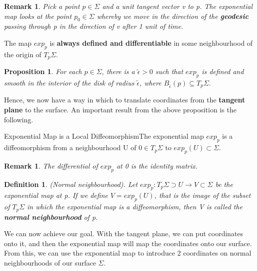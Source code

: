 \documentclass[twoside]{article}
\newtheorem{proposition}[theorem]{Proposition}
\newtheorem{definition}[theorem]{Definition}
\newtheorem{remark}[theorem]{Remark}
\begin{document}
\begin{remark}Pick a point $p \in \Sigma$ and a unit tangent vector v to p. The exponential map looks at the point $p_0 \in \Sigma$ whereby we move in the direction of the \textbf{geodesic} passing through p in the direction of v after 1 unit of time.
\end{remark}

The map $exp_p$ is \textbf{always defined and differentiable} in some neighbourhood of the origin of $T_p\Sigma.$

\begin{proposition}For each $p \in \Sigma$, there is a $\tilde{\epsilon} > 0$ such that $exp_p$ is defined and smooth in the interior of the disk of radius $\tilde{\epsilon}$, where $B_{\tilde{\epsilon}}(p) \subseteq T_p\Sigma.$
\end{proposition}
Hence, we now have a way in which to translate coordinates from the \textbf{tangent plane} to the surface.\newline
An important result from the above proposition is the following.
\begin{proposition_exam}{Exponential Map is a Local Diffeomorphism}{}The exponential map $exp_p$ is a diffeomorphism from a neighbourhood U of $0 \in T_p\Sigma$ to $exp_p(U) \subset \Sigma.$
\end{proposition_exam}
\begin{remark}The differential of $exp_p$ at 0 is the identity matrix.
\end{remark}


\begin{definition}(Normal neighbourhood). Let $exp_p: T_p\Sigma \supset U \rightarrow V \subset \Sigma $ be the exponential map at p. If we define $V = exp_p(U)$, that is the image of the subset of $T_p\Sigma$ in which the exponential map is a diffeomorphism, then V is called the \textbf{normal neighbourhood} of p.
\end{definition}

We can now achieve our goal. With the tangent plane, we can put coordinates onto it, and then the exponential map will map the coordinates onto our surface. From this, we can use the exponential map to introduce 2 coordinates on normal neighbourhoods of our surface $\Sigma$.
\end{document}
